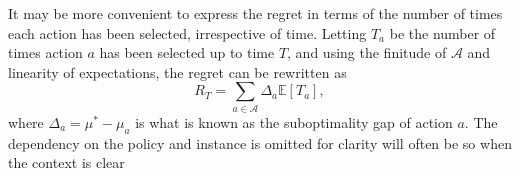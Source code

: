 It may be more convenient to express the regret in terms of the number of times each action has been selected, irrespective of time.
Letting $T_a$ be the number of times action $a$ has been selected up to time $T$, and using the finitude of $\mathcal{A}$ and linearity of expectations, the regret can be rewritten as
\begin{equation}
    R_T = \sum_{a \in \mathcal{A}} \Delta_a  \mathbb{E}[T_a],
    \label{eq:regret2}
\end{equation}
where $\Delta_a = \mu^* - \mu_a$ is what is known as the suboptimality gap of action $a$.
The dependency on the policy and instance is omitted for clarity will often be so when the context is clear
